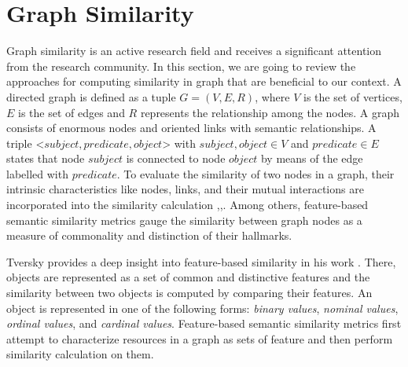 \section{Graph Similarity} \label{sec:GraphSimilarity}
Graph similarity is an active research field and receives a significant attention from the research community. In this section, we are going to review the approaches for computing similarity in graph that are beneficial to our context. A directed graph is defined as a tuple $G=(V,E,R)$, where $V$ is the set of vertices, $E$ is the set of edges and $R$ represents the relationship among the nodes. A graph consists of enormous nodes and oriented links with semantic relationships. A triple <$subject, predicate, object$> with $subject, object \in V$ and $predicate \in E$ states that node $subject$ is connected to node $object$ by means of the edge labelled with $predicate$. To evaluate the similarity of two nodes in a graph, their intrinsic characteristics like nodes, links, and their mutual interactions are incorporated into the similarity calculation \cite{DiNoia:2012:LOD:2362499.2362501},\cite{Nguyen:2015:CRV:2942298.2942305},\cite{Nguyen:2015:ESP:2740908.2742141}. Among others, feature-based semantic similarity metrics gauge the similarity between graph nodes as a measure of commonality and distinction of their hallmarks.

Tversky provides a deep insight into feature-based similarity in his work \cite{tversky1977features}. There, objects are represented as a set of common and distinctive features and the similarity between two objects is computed by comparing their features. An object is represented in one of the following forms: \emph{binary values}, \emph{nominal values}, \emph{ordinal values}, and \emph{cardinal values}. Feature-based semantic similarity metrics first attempt to characterize resources in a graph as sets of feature and then perform similarity calculation on them.





